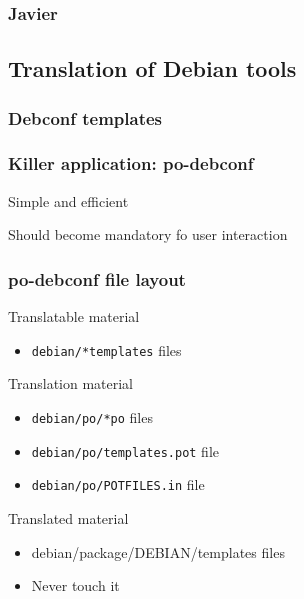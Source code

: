 \documentclass{beamer}
\begin{document}
\begin{frame}
  \frametitle{Javier}
\end{frame}

\subsection{Translation of Debian tools}

\subsubsection{Debconf templates}

\begin{frame}
  \frametitle{Killer application: po-debconf}
	\begin{block}
		{Simple and efficient}
	\end{block}
	\begin{block}
		{Should become mandatory fo user interaction}
	\end{block}
\end{frame}

\begin{frame}
  \frametitle{po-debconf file layout}
	\begin{block}{Translatable material}
		\begin{itemize}
		\item
			\texttt{debian/*templates} files
		\end{itemize}
	\end{block}
	\begin{block}{Translation material}
		\begin{itemize}
		\item
			\texttt{debian/po/*po} files
		\item
			\texttt{debian/po/templates.pot} file
		\item
			\texttt{debian/po/POTFILES.in} file
		\end{itemize}
	\end{block}
	\begin{block}{Translated material}
		\begin{itemize}
		\item
			debian/package/DEBIAN/templates files
		\item
			Never touch it
		\end{itemize}
	\end{block}
\end{frame}
\end{document}
